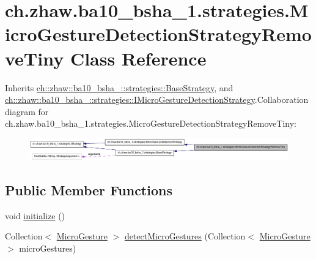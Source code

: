 \hypertarget{classch_1_1zhaw_1_1ba10__bsha__1_1_1strategies_1_1MicroGestureDetectionStrategyRemoveTiny}{
\section{ch.zhaw.ba10\_\-bsha\_\-1.strategies.MicroGestureDetectionStrategyRemoveTiny Class Reference}
\label{classch_1_1zhaw_1_1ba10__bsha__1_1_1strategies_1_1MicroGestureDetectionStrategyRemoveTiny}
}


Inherits \hyperlink{classch_1_1zhaw_1_1ba10__bsha__1_1_1strategies_1_1BaseStrategy}{ch::zhaw::ba10\_\-bsha\_::strategies::BaseStrategy}, and \hyperlink{interfacech_1_1zhaw_1_1ba10__bsha__1_1_1strategies_1_1IMicroGestureDetectionStrategy}{ch::zhaw::ba10\_\-bsha\_::strategies::IMicroGestureDetectionStrategy}.Collaboration diagram for ch.zhaw.ba10\_\-bsha\_\-1.strategies.MicroGestureDetectionStrategyRemoveTiny:\nopagebreak
\begin{figure}[H]
\begin{center}
\leavevmode
\includegraphics[width=400pt]{classch_1_1zhaw_1_1ba10__bsha__1_1_1strategies_1_1MicroGestureDetectionStrategyRemoveTiny__coll__graph}
\end{center}
\end{figure}
\subsection*{Public Member Functions}
\begin{DoxyCompactItemize}
\item 
void \hyperlink{classch_1_1zhaw_1_1ba10__bsha__1_1_1strategies_1_1MicroGestureDetectionStrategyRemoveTiny_af72863c74640818ca3bf5ccba7957224}{initialize} ()
\item 
Collection$<$ \hyperlink{classch_1_1zhaw_1_1ba10__bsha__1_1_1service_1_1MicroGesture}{MicroGesture} $>$ \hyperlink{classch_1_1zhaw_1_1ba10__bsha__1_1_1strategies_1_1MicroGestureDetectionStrategyRemoveTiny_a3a51833545b6e87173dbacf505e44359}{detectMicroGestures} (Collection$<$ \hyperlink{classch_1_1zhaw_1_1ba10__bsha__1_1_1service_1_1MicroGesture}{MicroGesture} $>$ microGestures)
\end{DoxyCompactItemize}
